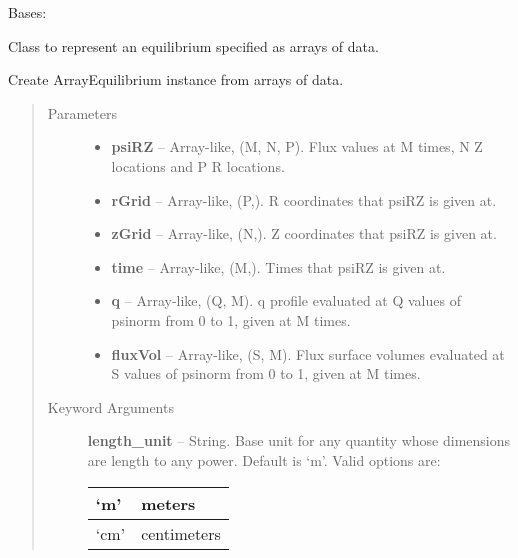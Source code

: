 \documentclass[letterpaper,10pt,english]{sphinxmanual}
\begin{document}
\begin{fulllineitems}
\label{eqtools:eqtools.FromArrays.ArrayEquilibrium}
Bases: {\hyperref[eqtools:eqtools.core.Equilibrium]{}}

Class to represent an equilibrium specified as arrays of data.

Create ArrayEquilibrium instance from arrays of data.
\begin{quote}\begin{description}
\item[{Parameters }] \leavevmode\begin{itemize}
\item {} 
\textbf{psiRZ} --
Array-like, (M, N, P).
Flux values at M times, N Z locations and P R locations.

\item {} 
\textbf{rGrid} --
Array-like, (P,).
R coordinates that psiRZ is given at.

\item {} 
\textbf{zGrid} --
Array-like, (N,).
Z coordinates that psiRZ is given at.

\item {} 
\textbf{time} --
Array-like, (M,).
Times that psiRZ is given at.

\item {} 
\textbf{q} --
Array-like, (Q, M).
q profile evaluated at Q values of psinorm from 0 to 1, given at M
times.

\item {} 
\textbf{fluxVol} --
Array-like, (S, M).
Flux surface volumes evaluated at S values of psinorm from 0 to 1,
given at M times.

\end{itemize}

\item[{Keyword Arguments}] \leavevmode
\textbf{length\_unit} --
String.
Base unit for any quantity whose dimensions are length to any power.
Default is `m'. Valid options are:

\begin{tabulary}{\linewidth}{|L|L|}
\hline

`m'
 & 
meters
\\\hline

`cm'
 & 
centimeters
\\\hline


\end{tabulary}
\end{description}
\end{quote}
\end{fulllineitems}
\end{document}
